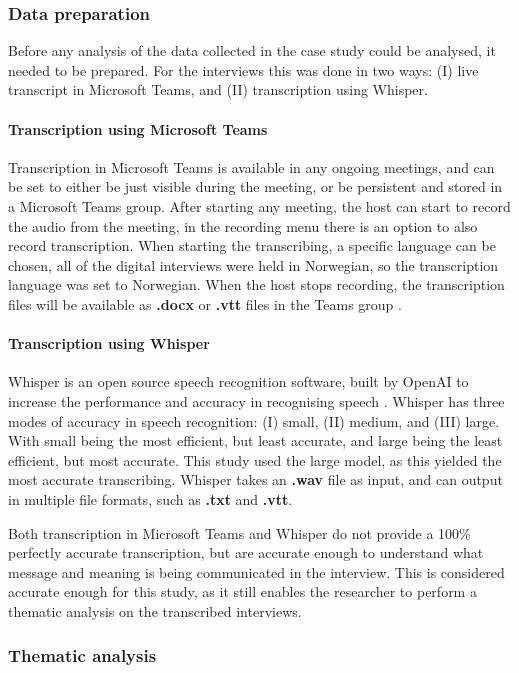 \subsubsection{Data preparation}
Before any analysis of the data collected in the case study could be analysed, it needed to be prepared. For the interviews this was done in two ways: (I) live transcript in Microsoft Teams, and (II) transcription using Whisper.

\paragraph{Transcription using Microsoft Teams}
Transcription in Microsoft Teams is available in any ongoing meetings, and can be set to either be just visible during the meeting, or be persistent and stored in a Microsoft Teams group. After starting any meeting, the host can start to record the audio from the meeting, in the recording menu there is an option to also record transcription. When starting the transcribing, a specific language can be chosen, all of the digital interviews were held in Norwegian, so the transcription language was set to Norwegian. When the host stops recording, the transcription files will be available as \textbf{.docx} or \textbf{.vtt} files in the Teams group \cite{mt_2022}.

\paragraph{Transcription using Whisper}
Whisper is an open source speech recognition software, built by OpenAI to increase the performance and accuracy in recognising speech \cite{oa_2022}. Whisper has three modes of accuracy in speech recognition: (I) small, (II) medium, and (III) large. With small being the most efficient, but least accurate, and large being the least efficient, but most accurate. This study used the large model, as this yielded the most accurate transcribing. Whisper takes an \textbf{.wav} file as input, and can output in multiple file formats, such as \textbf{.txt} and \textbf{.vtt}.

Both transcription in Microsoft Teams and Whisper do not provide a 100\% perfectly accurate transcription, but are accurate enough to understand what message and meaning is being communicated in the interview. This is considered accurate enough for this study, as it still enables the researcher to perform a thematic analysis on the transcribed interviews.

\subsubsection{Thematic analysis}


